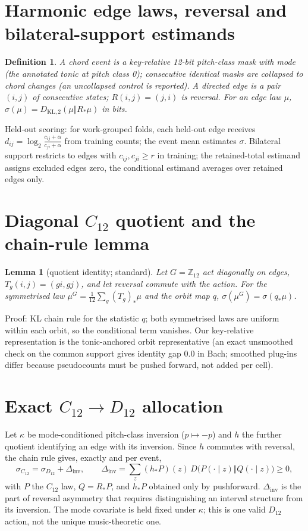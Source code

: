 \documentclass[11pt]{article}
\newtheorem{lemma}{Lemma}\newtheorem{definition}{Definition}
\begin{document}
\section{Harmonic edge laws, reversal and bilateral-support estimands}
\begin{definition}A chord event is a key-relative 12-bit pitch-class mask with mode (the annotated tonic at pitch class 0); consecutive identical masks are collapsed to chord changes (an uncollapsed control is reported). A directed edge is a pair $(i,j)$ of consecutive states; $R(i,j)=(j,i)$ is reversal. For an edge law $\mu$, $\sigma(\mu)=D_{\mathrm{KL},2}(\mu\Vert R_*\mu)$ in bits.\end{definition}
Held-out scoring: for work-grouped folds, each held-out edge receives $d_{ij}=\log_2\frac{c_{ij}+\alpha}{c_{ji}+\alpha}$ from training counts; the event mean estimates $\sigma$. Bilateral support restricts to edges with $c_{ij},c_{ji}\ge r$ in training; the retained-total estimand assigns excluded edges zero, the conditional estimand averages over retained edges only.

\section{Diagonal $C_{12}$ quotient and the chain-rule lemma}
\begin{lemma}[quotient identity; standard]Let $G=\mathbb Z_{12}$ act diagonally on edges, $T_g(i,j)=(gi,gj)$, and let reversal commute with the action. For the symmetrised law $\mu^G=\frac{1}{12}\sum_g (T_g)_*\mu$ and the orbit map $q$, $\sigma(\mu^G)=\sigma(q_*\mu)$.\end{lemma}
Proof: KL chain rule for the statistic $q$; both symmetrised laws are uniform within each orbit, so the conditional term vanishes. Our key-relative representation is the tonic-anchored orbit representative (an exact unsmoothed check on the common support gives identity gap $0.0$ in Bach; smoothed plug-ins differ because pseudocounts must be pushed forward, not added per cell).

\section{Exact $C_{12}\rightarrow D_{12}$ allocation}
Let $\kappa$ be mode-conditioned pitch-class inversion ($p\mapsto -p$) and $h$ the further quotient identifying an edge with its inversion. Since $h$ commutes with reversal, the chain rule gives, exactly and per event,
\[\sigma_{C_{12}}=\sigma_{D_{12}}+\Delta_{\mathrm{inv}},\qquad \Delta_{\mathrm{inv}}=\sum_z (h_*P)(z)\,D\big(P(\cdot\mid z)\Vert Q(\cdot\mid z)\big)\ge0,\]
with $P$ the $C_{12}$ law, $Q=R_*P$, and $h_*P$ obtained only by pushforward. $\Delta_{\mathrm{inv}}$ is the part of reversal asymmetry that requires distinguishing an interval structure from its inversion. The mode covariate is held fixed under $\kappa$; this is one valid $D_{12}$ action, not the unique music-theoretic one.
\end{document}
